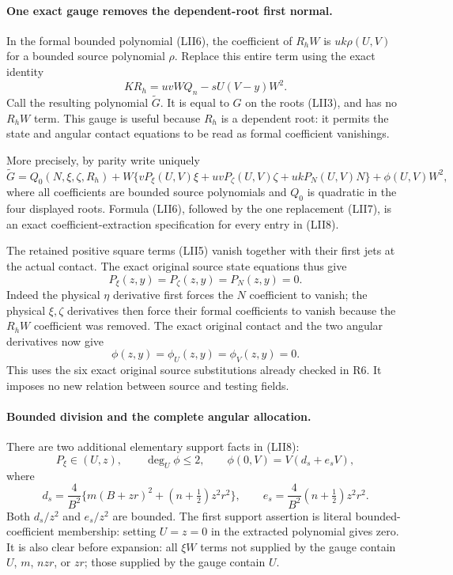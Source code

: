 \paragraph{One exact gauge removes the dependent-root first normal.}
In the formal bounded polynomial (LII6), the coefficient of $R_hW$
is $uk\rho(U,V)$ for a bounded source polynomial $\rho$.  Replace
this entire term using the exact identity
\[
 KR_h=uvWQ_n-sU(V-y)W^2.                         \tag{LII7}
\]
Call the resulting polynomial $\widetilde G$.  It is equal to $G$
on the roots (LII3), and has no $R_hW$ term.  This gauge is useful
because $R_h$ is a dependent root: it permits the state and angular
contact equations to be read as formal coefficient vanishings.

More precisely, by parity write uniquely
\[
 \widetilde G=Q_0(N,\xi,\zeta,R_h)
 +W\{vP_\xi(U,V)\xi+uvP_\zeta(U,V)\zeta
                         +ukP_N(U,V)N\}
 +\phi(U,V)W^2,                                  \tag{LII8}
\]
where all coefficients are bounded source polynomials and $Q_0$ is
quadratic in the four displayed roots.  Formula (LII6), followed by
the one replacement (LII7), is an exact coefficient-extraction
specification for every entry in (LII8).

The retained positive square terms (LII5) vanish together with their first jets at
the actual contact.  The exact original source state equations thus
give
\[
 P_\xi(z,y)=P_\zeta(z,y)=P_N(z,y)=0.              \tag{LII9}
\]
Indeed the physical $\eta$ derivative first forces the $N$ coefficient
to vanish; the physical $\xi,\zeta$ derivatives then force their
formal coefficients to vanish because the $R_hW$ coefficient was
removed.  The exact original contact and the two angular derivatives
now give
\[
 \phi(z,y)=\phi_U(z,y)=\phi_V(z,y)=0.              \tag{LII10}
\]
This uses the six exact original source substitutions already checked
in R6.  It imposes no new relation between source and testing fields.

\paragraph{Bounded division and the complete angular allocation.}
There are two additional elementary support facts in (LII8):
\[
 P_\xi\in(U,z),\qquad \deg_U\phi\leq2,\qquad
 \phi(0,V)=V(d_s+e_sV),                           \tag{LII11}
\]
where
\[
 d_s=\frac4{B^2}\{m(B+zr)^2+(n+\tfrac12)z^2r^2\},\qquad
 e_s=\frac4{B^2}(n+\tfrac12)z^2r^2.
\]
Both $d_s/z^2$ and $e_s/z^2$ are bounded.  The first support assertion
is literal bounded-coefficient membership: setting $U=z=0$ in the
extracted polynomial gives zero.  It is also clear before expansion:
all $\xi W$ terms not supplied by the gauge contain $U$, $m$, $nzr$,
or $zr$; those supplied by the gauge contain $U$.

